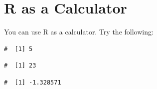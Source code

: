 \documentclass[a4paper,9pt,twocolumn,twoside,printwatermark=false]{pinp}
\begin{document}
\section{R as a Calculator}\label{r-as-a-calculator}

You can use R as a calculator. Try the following:

\begin{Shaded}
\begin{Highlighting}[]
 \OperatorTok{+}\StringTok{ }           
\end{Highlighting}
\end{Shaded}

\begin{ShadedResult}
\begin{verbatim}
#  [1] 5
\end{verbatim}
\end{ShadedResult}

\begin{Shaded}
\begin{Highlighting}[]
\NormalTok{(}\OperatorTok{*}\NormalTok{) }\OperatorTok{-}\StringTok{ }     
\end{Highlighting}
\end{Shaded}

\begin{ShadedResult}
\begin{verbatim}
#  [1] 23
\end{verbatim}
\end{ShadedResult}

\begin{Shaded}
\begin{Highlighting}[]
\NormalTok{(}\OperatorTok{/}\NormalTok{) }\OperatorTok{-}\StringTok{ }
\end{Highlighting}
\end{Shaded}

\begin{ShadedResult}
\begin{verbatim}
#  [1] -1.328571
\end{verbatim}
\end{ShadedResult}

\begin{Shaded}
\begin{Highlighting}[]
\OperatorTok{^} 
\end{Highlighting}
\end{Shaded}
\end{document}
